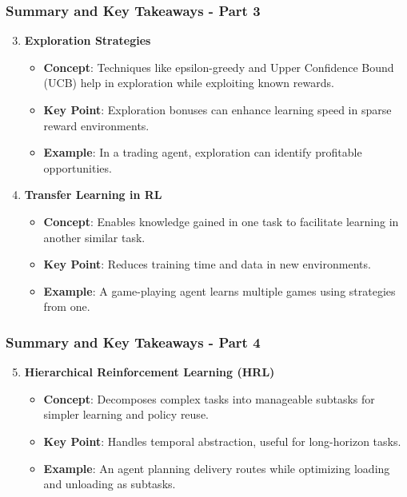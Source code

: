 \documentclass[aspectratio=169]{beamer}
\begin{document}
\begin{frame}[fragile]
    \frametitle{Summary and Key Takeaways - Part 3}
    \begin{enumerate}
        \setcounter{enumi}{2}
        \item \textbf{Exploration Strategies}
        \begin{itemize}
            \item \textbf{Concept}: Techniques like epsilon-greedy and Upper Confidence Bound (UCB) help in exploration while exploiting known rewards.
            \item \textbf{Key Point}: Exploration bonuses can enhance learning speed in sparse reward environments.
            \item \textbf{Example}: In a trading agent, exploration can identify profitable opportunities.
        \end{itemize}

        \item \textbf{Transfer Learning in RL}
        \begin{itemize}
            \item \textbf{Concept}: Enables knowledge gained in one task to facilitate learning in another similar task.
            \item \textbf{Key Point}: Reduces training time and data in new environments.
            \item \textbf{Example}: A game-playing agent learns multiple games using strategies from one.
        \end{itemize}
    \end{enumerate}
\end{frame}

\begin{frame}[fragile]
    \frametitle{Summary and Key Takeaways - Part 4}
    \begin{enumerate}
        \setcounter{enumi}{4}
        \item \textbf{Hierarchical Reinforcement Learning (HRL)}
        \begin{itemize}
            \item \textbf{Concept}: Decomposes complex tasks into manageable subtasks for simpler learning and policy reuse.
            \item \textbf{Key Point}: Handles temporal abstraction, useful for long-horizon tasks.
            \item \textbf{Example}: An agent planning delivery routes while optimizing loading and unloading as subtasks.
        \end{itemize}
    \end{enumerate}
\end{frame}
\end{document}
